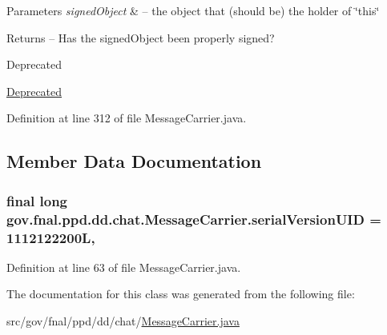 \begin{DoxyParams}{Parameters}
{\em signed\-Object} & -- the object that (should be) the holder of \char`\"{}this\char`\"{} \\
\hline
\end{DoxyParams}
\begin{DoxyReturn}{Returns}
-- Has the signed\-Object been properly signed? 
\end{DoxyReturn}
\begin{DoxyRefDesc}{Deprecated}
\item[\hyperlink{deprecated__deprecated000002}{Deprecated}]\end{DoxyRefDesc}


Definition at line 312 of file Message\-Carrier.\-java.



\subsection{Member Data Documentation}
\hypertarget{classgov_1_1fnal_1_1ppd_1_1dd_1_1chat_1_1MessageCarrier_a9baff4617fbbc2df811eae214ec9980c}{
\subsubsection[{serial\-Version\-U\-I\-D}]{\setlength{\rightskip}{0pt plus 5cm}final long gov.\-fnal.\-ppd.\-dd.\-chat.\-Message\-Carrier.\-serial\-Version\-U\-I\-D = 1112122200\-L\hspace{0.3cm}{\ttfamily [static]}, {\ttfamily [protected]}}}\label{classgov_1_1fnal_1_1ppd_1_1dd_1_1chat_1_1MessageCarrier_a9baff4617fbbc2df811eae214ec9980c}


Definition at line 63 of file Message\-Carrier.\-java.



The documentation for this class was generated from the following file\-:\begin{DoxyCompactItemize}
\item 
src/gov/fnal/ppd/dd/chat/\hyperlink{MessageCarrier_8java}{Message\-Carrier.\-java}\end{DoxyCompactItemize}
